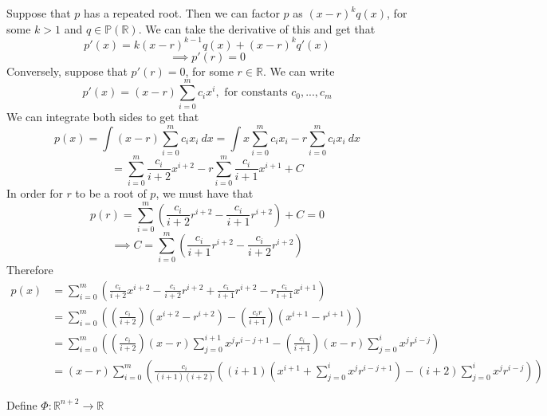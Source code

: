 \documentclass{article}
\theoremstyle{plain} %
\numberwithin{thm}{section} %
\theoremstyle{definition}
\begin{document}
\begin{question}{35}
    Suppose that \(p\) has a repeated root. Then we can factor \(p\) as \((x - r)^k q(x)\), for some \(k > 1\) and \(q \in \mathbb{P} (\mathbb{R})\). We can take the derivative of this and get that
    \[
        p'(x) = k(x - r)^{k-1} q(x) + (x - r)^k q'(x)
    \]
    \[
        \implies p'(r) = 0
    \]
    Conversely, suppose that \(p'(r) = 0\), for some \(r \in \mathbb{R}\). We can write
    \[
        p'(x) = (x - r)\sum_{i=0}^{m} c_i x^i, \text{ for constants } c_0, ..., c_m
    \]
    We can integrate both sides to get that
    \[
        p(x) = \int (x - r) \sum_{i=0}^{m} c_i x_i\ dx = \int x\sum_{i=0}^{m} c_i x_i - r\sum_{i=0}^{m} c_i x_i\ dx
    \]
    \[
        = \sum_{i=0}^{m} \frac{c_i}{i+2}x^{i+2} - r \sum_{i=0}^{m} \frac{c_i}{i+1}x^{i+1} + C
    \]
    In order for \(r\) to be a root of \(p\), we must have that
    \[
        p(r) = \sum_{i=0}^{m} \left(\frac{c_i}{i+2}r^{i+2} - \frac{c_i}{i+1}r^{i+2}\right) + C = 0
    \]
    \[
        \implies C = \sum_{i=0}^{m} \left(\frac{c_i}{i+1}r^{i+2} - \frac{c_i}{i+2}r^{i+2}\right)
    \]
    Therefore
    \begin{align*}
        p(x) &= \sum_{i=0}^{m} \left( \frac{c_i}{i+2}x^{i+2} - \frac{c_i}{i + 2}r^{i+2} + \frac{c_i}{i+1}r^{i+2} - r\frac{c_i}{i + 1}x^{i+1} \right) \\
        &= \sum_{i=0}^{m} \left( \left( \frac{c_i}{i+2} \right)(x^{i+2} - r^{i+2}) - \left( \frac{c_i r}{i + 1} \right)(x^{i+1} - r^{i+1})\right) \\
        &= \sum_{i=0}^{m} \left( \left( \frac{c_i}{i + 2} \right)(x - r) \sum_{j=0}^{i+1} x^j r^{i - j + 1} - \left( \frac{c_i}{i + 1} \right)(x - r)\sum_{j=0}^{i} x^j r^{i-j} \right) \\
        &= (x - r)\sum_{i=0}^{m} \left( \frac{c_i}{(i+1)(i+2)} \left( (i + 1)\left(x^{i+1} + \sum_{j=0}^{i} x^j r^{i-j+1} \right) - (i + 2)\sum_{j=0}^{i} x^j r^{i-j} \right) \right) 
    \end{align*}

    Define \(\Phi : \mathbb{R}^{n+2} \to \mathbb{R}\) 
    \end{question}
\end{document}

